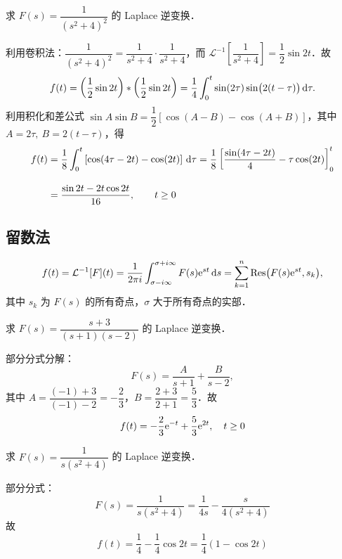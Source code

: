\documentclass[12pt, a4paper, oneside, UTF8]{ctexbook}
\begin{document}
\begin{example}
    求 $F(s) = \dfrac{1}{(s^2+4)^2}$ 的 Laplace 逆变换．
\end{example}
\begin{solution}
    利用卷积法：$\dfrac{1}{(s^2+4)^2}=\dfrac{1}{s^2+4}\cdot\dfrac{1}{s^2+4}$，而
    $\mathcal{L}^{-1}\!\left[\dfrac{1}{s^2+4}\right]=\dfrac{1}{2}\sin 2t$．故
    \[
    f(t)=\left(\frac{1}{2}\sin 2t\right)*\left(\frac{1}{2}\sin 2t\right)
    =\frac{1}{4}\int_0^t \sin(2\tau)\sin\bigl(2(t-\tau)\bigr)\,\mathrm{d}\tau.
    \]
    利用积化和差公式 $\sin A\sin B=\dfrac{1}{2}[\cos(A-B)-\cos(A+B)]$，其中
    $A=2\tau,\ B=2(t-\tau)$，得
    \begin{align*}
        f(t)&=\frac{1}{8}\int_0^t\left[\cos(4\tau-2t)-\cos(2t)\right]\,\mathrm{d}\tau
        =\frac{1}{8}\left[\frac{\sin(4\tau-2t)}{4}-\tau\cos(2t)\right]_0^t\\[1em]
        &=\frac{\sin 2t-2t\cos 2t}{16},\qquad t\ge 0
    \end{align*}

\end{solution}

\subsection{留数法}
\begin{theorem}[Bromwich 积分]
\[
f(t) = \L^{-1}[F](t) = \frac{1}{2\pi i}\int_{\sigma-i\infty}^{\sigma+i\infty} F(s)\e^{st}\,\d s = \sum_{k=1}^{n}\Res(F(s)\e^{st},s_k),
\]
其中 $s_k$ 为 $F(s)$ 的所有奇点，$\sigma$ 大于所有奇点的实部．
\end{theorem}

\begin{example}
求 $F(s)=\dfrac{s+3}{(s+1)(s-2)}$ 的 Laplace 逆变换．
\end{example}
\begin{solution}
部分分式分解：
\[
F(s) = \frac{A}{s+1} + \frac{B}{s-2},
\]
其中 $A = \dfrac{(-1)+3}{(-1)-2} = -\dfrac{2}{3}$，$B = \dfrac{2+3}{2+1} = \dfrac{5}{3}$．故
\[
f(t) = -\frac{2}{3}\mathrm{e}^{-t} + \frac{5}{3}\mathrm{e}^{2t},\quad t\ge 0
\]
\end{solution}

\begin{example}
求 $F(s)=\dfrac{1}{s(s^2+4)}$ 的 Laplace 逆变换．
\end{example}
\begin{solution}
部分分式：
\[
F(s) = \frac{1}{s(s^2+4)} = \frac{1}{4s} - \frac{s}{4(s^2+4)}
\]
故
\[
f(t) = \frac{1}{4} - \frac{1}{4}\cos 2t = \frac{1}{4}(1-\cos 2t)
\]
\end{solution}
\end{document}
